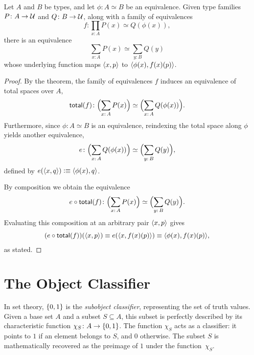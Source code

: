 \begin{cor}\label{cor:total-extension}
    Let\/ $A$ and\/ $B$ be types, and let\/ $\phi\colon A\simeq B$ be an equivalence. Given type families\/ $P\colon A\to\univ$ and\/ $Q\colon B\to\univ$, along with a family of equivalences
    \[
        f\colon\prod_{x\colon A}P(x)\simeq Q(\phi(x)),
    \]
    there is an equivalence
    \[
        \sum_{x\colon A}P(x)\simeq\sum_{y\colon B}Q(y)
    \]
    whose underlying function maps\/ $\langle x,p\rangle$ to\/ $\langle\phi(x),f(x)(p)\rangle$.
\end{cor}

\begin{proof}
    By the theorem, the family of equivalences $f$ induces an equivalence of total spaces over $A$,
    \[
        \fun{total}(f)\colon
            \Bigl(
                \sum_{x\colon A}P(x)
            \Bigr)
            \simeq
            \Bigl(
                \sum_{x\colon A}Q(\phi(x))
            \Bigr).
    \]
    Furthermore, since $\phi\colon A\simeq B$ is an equivalence, reindexing the total space along $\phi$ yields another equivalence,
    \[
        e\colon\Bigl(\sum_{x\colon A}Q(\phi(x))\Bigr)\simeq\Bigl(\sum_{y\colon B}Q(y)\Bigr),
    \]
    defined by $e(\langle x,q\rangle)\mathrel{\vcentcolon}\equiv\langle\phi(x), q\rangle$.

    By composition we obtain the equivalence
    \[
        e\circ\fun{total}(f)\colon
            \Bigl(
                \sum_{x\colon A}P(x)
            \Bigr)
            \simeq
            \Bigl(
                \sum_{y\colon B}Q(y)
            \Bigr).
    \]
    Evaluating this composition at an arbitrary pair $\langle x,p\rangle$ gives
    \[
        (e\circ\mathsf{total}(f))(\langle x,p\rangle)\equiv e(\langle x,f(x)(p)\rangle)
            \equiv\langle\phi(x),f(x)(p)\rangle,
    \]
    as stated.
\end{proof}

\section{The Object Classifier}

In set theory, $\{0,1\}$ is the \textsl{subobject classifier}, representing the set of truth values. Given a base set $A$ and a subset $S \subseteq A$, this subset is perfectly described by its characteristic function $\chi_S \colon A \to \set{0,1}$. The function $\chi_S$ acts as a classifier: it points to $1$ if an element belongs to $S$, and $0$ otherwise. The subset $S$ is mathematically recovered as the preimage of $1$ under the function~$\chi_S$.

